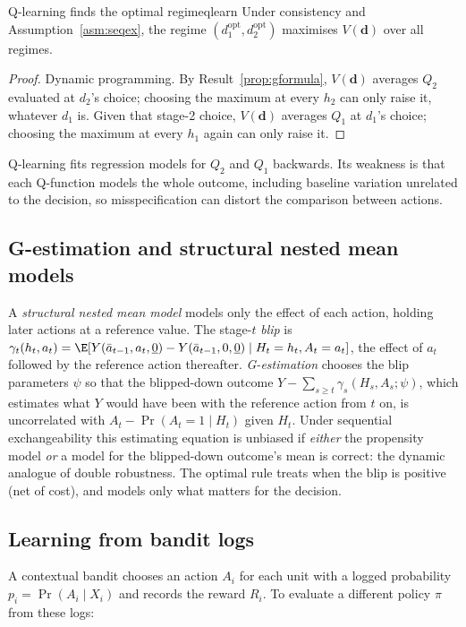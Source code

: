 \documentclass[11pt]{article}
\begin{document}
\begin{prop}{Q-learning finds the optimal regime}{qlearn}
Under consistency and Assumption~\ref{asm:seqex}, the regime $(d_1^{\text{opt}}, d_2^{\text{opt}})$ maximises $V(\mathbf d)$ over all
regimes.
\end{prop}
\begin{proof}
Dynamic programming. By Result~\ref{prop:gformula}, $V(\mathbf d)$ averages $Q_2$ evaluated at $d_2$'s choice; choosing the maximum at
every $h_2$ can only raise it, whatever $d_1$ is. Given that stage-2 choice, $V(\mathbf d)$ averages $Q_1$ at $d_1$'s choice;
choosing the maximum at every $h_1$ again can only raise it.
\end{proof}

Q-learning fits regression models for $Q_2$ and $Q_1$ backwards. Its weakness is that each Q-function models the whole
outcome, including baseline variation unrelated to the decision, so misspecification can distort the comparison between
actions.

\subsection{G-estimation and structural nested mean models}

A \emph{structural nested mean model} models only the effect of each action, holding later actions at a reference value. The
stage-$t$ \emph{blip} is $\gamma_t(h_t, a_t) = \E[Y(\bar a_{t-1}, a_t, \underline 0) - Y(\bar a_{t-1}, 0, \underline 0) \mid H_t = h_t, A_t = a_t]$, the
effect of $a_t$ followed by the reference action thereafter. \emph{G-estimation} chooses the blip parameters $\psi$ so that the
blipped-down outcome $Y - \sum_{s \ge t}\gamma_s(H_s, A_s; \psi)$, which estimates what $Y$ would have been with the reference
action from $t$ on, is uncorrelated with $A_t - \Pr(A_t = 1 \mid H_t)$ given $H_t$. Under sequential exchangeability this
estimating equation is unbiased if \emph{either} the propensity model \emph{or} a model for the blipped-down outcome's mean is
correct: the dynamic analogue of double robustness. The optimal rule treats when the blip is positive (net of cost), and
models only what matters for the decision.

\subsection{Learning from bandit logs}

A contextual bandit chooses an action $A_i$ for each unit with a logged probability $p_i = \Pr(A_i \mid X_i)$ and records the
reward $R_i$. To evaluate a different policy $\pi$ from these logs:
\end{document}
